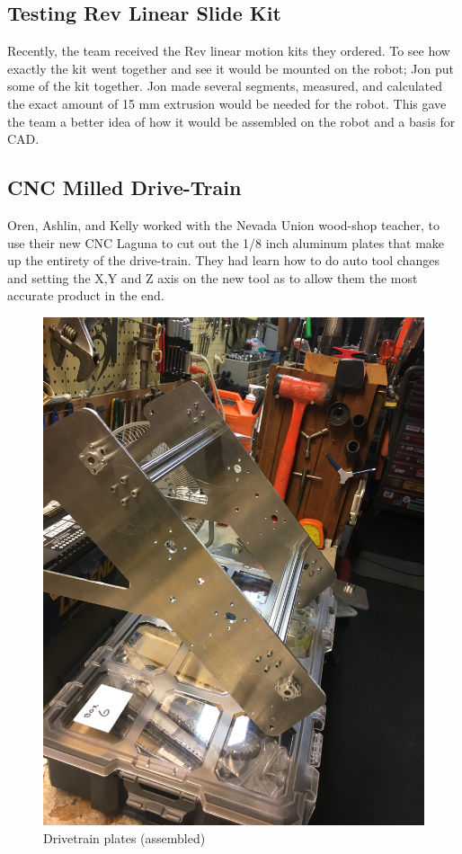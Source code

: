 \documentclass{article}
\begin{document}
\subsection{Testing Rev Linear Slide Kit}
Recently, the team received the Rev linear motion kits they ordered. To see how exactly the kit went together and see it would be mounted on the robot; Jon put some of the kit together. Jon made several segments, measured, and calculated the exact amount of 15 mm extrusion would be needed for the robot. This gave the team a better idea of how it would be assembled on the robot and a basis for CAD.

\subsection{CNC Milled Drive-Train }
Oren, Ashlin, and Kelly worked with the Nevada Union wood-shop teacher, to use their new CNC Laguna to cut out the 1/8 inch aluminum plates that make up the entirety of the drive-train. They had learn how to do auto tool changes and setting the X,Y and Z axis on the new tool as to allow them the most accurate product in the end.

\begin{figure}
    \centering
    \includegraphics[width=.6 \textwidth]{07_10-15/images/drivetrain.JPG}
    \caption{Drivetrain plates (assembled)}
    \label{fig:plates}
\end{figure}
\end{document}
